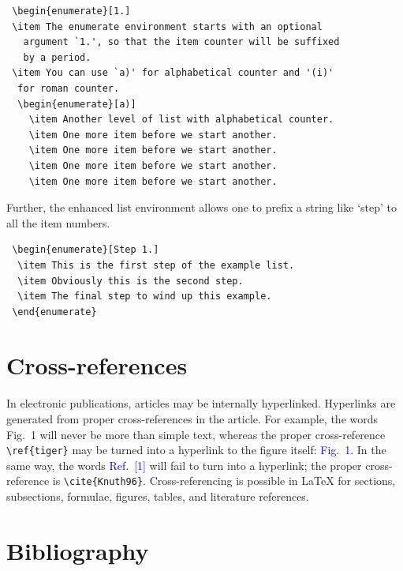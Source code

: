 \documentclass[a4paper,fleqn]{cas-dc}
\begin{document}
\begin{verbatim}
 \begin{enumerate}[1.]
 \item The enumerate environment starts with an optional
   argument `1.', so that the item counter will be suffixed
   by a period.
 \item You can use `a)' for alphabetical counter and '(i)' 
  for roman counter.
  \begin{enumerate}[a)]
    \item Another level of list with alphabetical counter.
    \item One more item before we start another.
    \item One more item before we start another.
    \item One more item before we start another.
    \item One more item before we start another.
\end{verbatim}

Further, the enhanced list environment allows one to prefix a
string like `step' to all the item numbers.  

\begin{verbatim}
 \begin{enumerate}[Step 1.]
  \item This is the first step of the example list.
  \item Obviously this is the second step.
  \item The final step to wind up this example.
 \end{enumerate}
\end{verbatim}

\section{Cross-references}
In electronic publications, articles may be internally
hyperlinked. Hyperlinks are generated from proper
cross-references in the article.  For example, the words
\textcolor{black!80}{Fig.~1} will never be more than simple text,
whereas the proper cross-reference \verb+\ref{tiger}+ may be
turned into a hyperlink to the figure itself:
\textcolor{blue}{Fig.~1}.  In the same way,
the words \textcolor{blue}{Ref.~[1]} will fail to turn into a
hyperlink; the proper cross-reference is \verb+\cite{Knuth96}+.
Cross-referencing is possible in \LaTeX{} for sections,
subsections, formulae, figures, tables, and literature
references.

\section{Bibliography}
\end{document}
